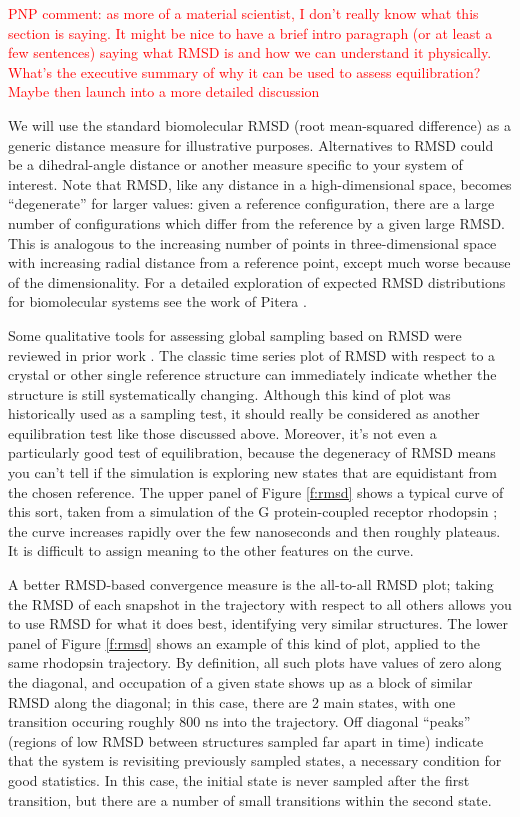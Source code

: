 \textcolor{red}{PNP comment: as more of a material scientist, I don't really know what this section is saying.  It might be nice to have a brief intro paragraph (or at least a few sentences) saying what RMSD is and how we can understand it physically.  What's the executive summary of why it can be used to assess equilibration?  Maybe then launch into a more detailed discussion}

We will use the standard biomolecular RMSD (root mean-squared difference) as a generic distance measure for illustrative purposes.
Alternatives to RMSD could be a dihedral-angle distance or another measure specific to your system of interest.
Note that RMSD, like any distance in a high-dimensional space, becomes ``degenerate'' for larger values: given a reference configuration, there are a large number of configurations which differ from the reference by a given large RMSD. This is analogous to the increasing number of points in three-dimensional space with increasing radial distance from a reference point, except much worse because of the dimensionality. For a detailed exploration of expected RMSD distributions for biomolecular systems see the work of Pitera \citep{Pitera2014}.

Some qualitative tools for assessing global sampling based on RMSD were reviewed
in prior work \cite{Grossfield2009}.   The classic time series plot of RMSD with
respect to a crystal or other single reference structure can immediately
indicate whether the structure is still systematically changing.  Although this
kind of plot was historically used as a sampling test, it should really be
considered as another equilibration test like those discussed above.  Moreover,
it's not even a particularly good test of equilibration, because the degeneracy
of RMSD means you can't tell if the simulation is exploring new states that are
equidistant from the chosen reference.  The upper panel of Figure \ref{f:rmsd}
shows a typical curve of this sort, taken from a simulation of the G
protein-coupled receptor rhodopsin \cite{Grossfield-2015}; the curve increases
rapidly over the few nanoseconds and then roughly plateaus.  It is difficult to
assign meaning to the other features on the curve.

A better RMSD-based convergence measure is the all-to-all RMSD plot; taking the
RMSD of each snapshot in the trajectory with respect to all others allows you to
use RMSD for what it does best, identifying very similar structures.  The lower
panel of Figure \ref{f:rmsd} shows an example of this kind of plot, applied to
the same rhodopsin trajectory.  By definition, all such plots have values of zero
along the diagonal, and occupation of a given state shows up as a block of
similar RMSD along the diagonal; in this case, there are 2 main states, with one
transition occuring roughly 800 ns into the trajectory.  Off diagonal ``peaks''
(regions of low RMSD between structures sampled far apart in time) indicate that
the system is revisiting previously sampled states, a necessary condition for
good statistics.  In this case, the initial state is never sampled after the
first transition, but there are a number of small transitions within the second
state.


